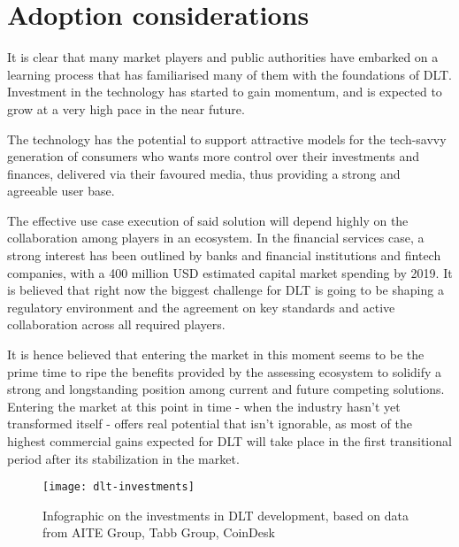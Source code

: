 \section{Adoption considerations}

It is clear that many market players and public authorities have embarked on a learning process that has familiarised many of them with the foundations of DLT. Investment in the technology has started to gain momentum, and is expected to grow at a very high pace in the near future.

The technology has the potential to support attractive models for the tech-savvy generation of consumers who wants more control over their investments and finances, delivered via their favoured media, thus providing a strong and agreeable user base.

The effective use case execution of said solution will depend highly on the collaboration among players in an ecosystem. In the financial services case, a strong interest has been outlined by banks and financial institutions and fintech companies, with a 400 million USD estimated capital market spending by 2019. 
It is believed that right now the biggest challenge for DLT is going to be shaping a regulatory environment and the agreement on key standards and active collaboration across all required players.

It is hence believed that entering the market in this moment seems to be the prime time to ripe the benefits provided by the assessing ecosystem to solidify a strong and longstanding position among current and future competing solutions. Entering the market at this point in time - when the industry hasn't yet transformed itself - offers real potential that isn't ignorable, as most of the highest commercial gains expected for DLT will take place in the first transitional period after its stabilization in the market.

\begin{figure}[h]
    \centering
    \texttt{[image: dlt-investments]}
    \caption{
        Infographic on the investments in DLT development,  based on data from AITE Group, Tabb Group, CoinDesk}
\end{figure}